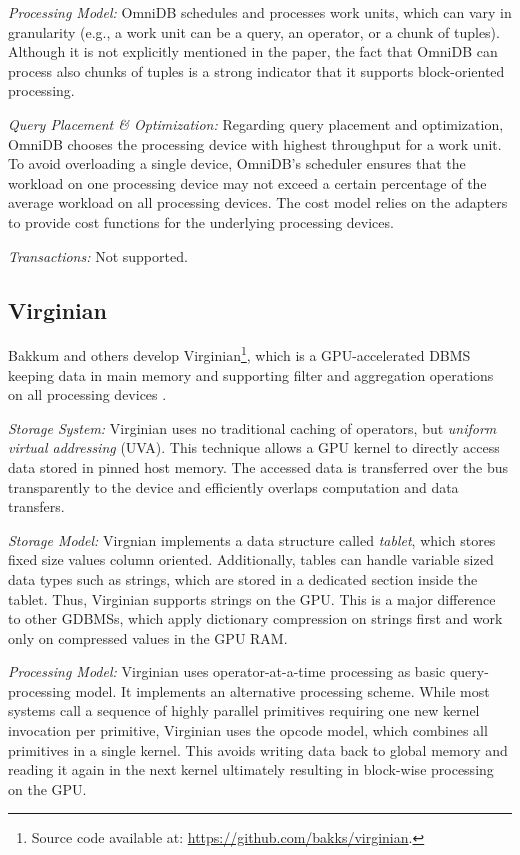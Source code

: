 \documentclass[twocolumn]{article}
\begin{document}
\noindent
\textit{Processing Model:} 
OmniDB schedules and processes work units, which can vary in granularity (e.g., a work unit can be a query, an operator, or a chunk of tuples). Although it is not explicitly mentioned in the paper, the fact that OmniDB can process also chunks of tuples is a strong indicator that it supports block-oriented processing.

\noindent
\textit{Query Placement \& Optimization:} 
Regarding query placement and optimization, OmniDB chooses the processing device with highest throughput for a work unit. To avoid overloading a single device, OmniDB’s scheduler ensures that the workload on one processing device may not exceed a certain percentage of the average workload on all processing devices. The cost model relies on the adapters to provide cost functions for the underlying processing devices.

\noindent
\textit{Transactions:} Not supported.

\subsection{Virginian}
Bakkum and others develop Virginian\footnote{Source code available at: \href{https://github.com/bakks/virginian}{https://github.com/bakks/virginian}.}, which is a GPU-accelerated DBMS keeping data in main memory and supporting filter and aggregation operations on all processing devices \cite{Bakkum:2012}.

\noindent
\textit{Storage System:} 
Virginian uses no traditional caching of operators, but \textit{uniform virtual addressing} (UVA). This technique allows a GPU kernel to directly access data stored in pinned host memory. The accessed data is transferred over the bus transparently to the device and efficiently overlaps computation and data transfers.

\noindent
\textit{Storage Model:} 
Virgnian implements a data structure called \textit{tablet}, which stores fixed size values column oriented. Additionally, tables can handle variable sized data types such as strings, which are stored in a dedicated section inside the tablet. Thus, Virginian supports strings on the GPU. This is a major difference to other GDBMSs, which apply dictionary compression on strings first and work only on compressed values in the GPU RAM.

\noindent
\textit{Processing Model:} Virginian uses operator-at-a-time processing as basic query- processing model. It implements an alternative processing scheme. While most systems call a sequence of highly parallel primitives requiring one new kernel invocation per primitive, Virginian uses the opcode model, which combines all primitives in a single kernel. This avoids writing data back to global memory and reading it again in the next kernel ultimately resulting in block-wise processing on the GPU.
\end{document}
